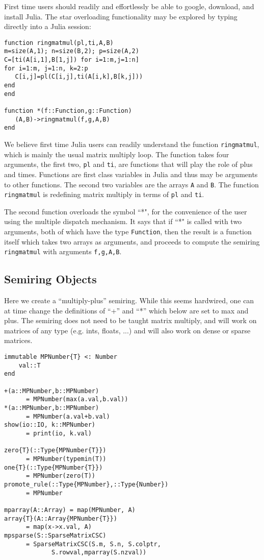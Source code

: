 \documentclass[conference]{IEEEtran}
\begin{document}
First time users should readily and effortlessly be able to google, download, and install Julia.
The star overloading functionality may be explored by typing directly into a Julia session:
\begin{verbatim}
function ringmatmul(pl,ti,A,B)
m=size(A,1); n=size(B,2); p=size(A,2)
C=[ti(A[i,1],B[1,j]) for i=1:m,j=1:n]
for i=1:m, j=1:n, k=2:p
   C[i,j]=pl(C[i,j],ti(A[i,k],B[k,j]))
end    
end      
   
function *(f::Function,g::Function)
   (A,B)->ringmatmul(f,g,A,B)
end
\end{verbatim}

We believe first time Julia users can readily understand the function {\tt ringmatmul}, which is mainly the usual matrix multiply loop.
The function takes four arguments, the first two, {\tt pl} and {\tt ti}, are functions that will play the role of plus and times.  Functions are first class variables in Julia and thus may be arguments to other functions.  The second two variables are the arrays {\tt A} and {\tt B}.
The function {\tt ringmatmul} is redefining matrix multiply in terms of {\tt pl} and {\tt ti}.

The second function overloads the symbol ``*", for the convenience of the user using the multiple dispatch mechanism.  It says that if ``*"  is called with two arguments, both of which have the type {\tt Function}, then the result is a function itself which takes two arrays as arguments, and proceeds to compute the semiring  {\tt ringmatmul} with arguments {\tt f,g,A,B}.


\subsection{Semiring Objects}

Here we create a ``multiply-plus'' semiring.  While this seems hardwired, one
can at time change the definitions of  ``+'' and ``*'' which below are set to 
max and plus.  The semiring does not need to be taught matrix multiply,
and will work on matrices of any type (e.g. ints, floats, ...) and will
also work on dense or sparse matrices.



\begin{verbatim}
immutable MPNumber{T} <: Number
    val::T
end

+(a::MPNumber,b::MPNumber)
      = MPNumber(max(a.val,b.val))
*(a::MPNumber,b::MPNumber)
      = MPNumber(a.val+b.val)
show(io::IO, k::MPNumber)
      = print(io, k.val)

zero{T}(::Type{MPNumber{T}})
      = MPNumber(typemin(T))
one{T}(::Type{MPNumber{T}})
      = MPNumber(zero(T))
promote_rule(::Type{MPNumber},::Type{Number}) 
      = MPNumber

mparray(A::Array) = map(MPNumber, A)
array{T}(A::Array{MPNumber{T}})
      = map(x->x.val, A)
mpsparse(S::SparseMatrixCSC)
      = SparseMatrixCSC(S.m, S.n, S.colptr, 
             S.rowval,mparray(S.nzval))
\end{verbatim}
\end{document}
